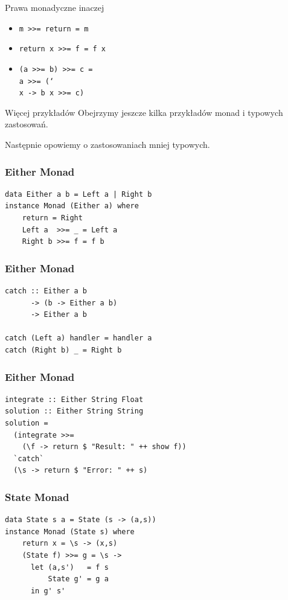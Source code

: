 \documentclass[14pt]{beamer}
\begin{document}
\begin{frame}{Prawa monadyczne inaczej}
    \begin{itemize}
        \item \texttt{m >>= return = m}
        \item \texttt{return x >>= f = f x}
        \item \texttt{(a >>= b) >>= c =\\
            a >>= (\char`\\x -> b x >>= c)}
    \end{itemize}
\end{frame}

\begin{frame}{Więcej przykładów}
    Obejrzymy jeszcze kilka przykładów monad i typowych zastosowań.

    Następnie opowiemy o zastosowaniach mniej typowych.
\end{frame}

\begin{frame}[fragile]
\frametitle{Either Monad}
\begin{verbatim}
data Either a b = Left a | Right b
instance Monad (Either a) where
    return = Right
    Left a  >>= _ = Left a
    Right b >>= f = f b
\end{verbatim}
\end{frame}

\begin{frame}[fragile]
\frametitle{Either Monad}
\begin{verbatim}
catch :: Either a b
      -> (b -> Either a b)
      -> Either a b

catch (Left a) handler = handler a
catch (Right b) _ = Right b
\end{verbatim}
\end{frame}

\begin{frame}[fragile]
\frametitle{Either Monad}
\begin{verbatim}
integrate :: Either String Float
solution :: Either String String
solution = 
  (integrate >>= 
    (\f -> return $ "Result: " ++ show f))
  `catch`
  (\s -> return $ "Error: " ++ s)
\end{verbatim}
\end{frame}

\begin{frame}[fragile]
\frametitle{State Monad}
\begin{verbatim}
data State s a = State (s -> (a,s))
instance Monad (State s) where
    return x = \s -> (x,s)
    (State f) >>= g = \s ->
      let (a,s')   = f s
          State g' = g a
      in g' s'
\end{verbatim}
\end{frame}
\end{document}

